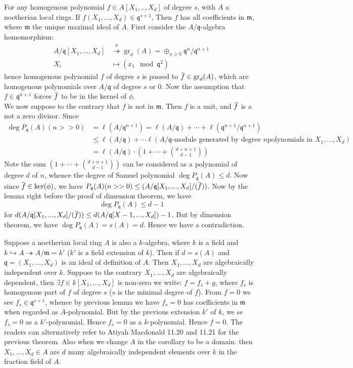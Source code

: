 \documentclass[12pt]{article}
\theoremstyle{definition}
\theoremstyle{plain}
\DeclareMathOperator{\gr}{gr}
\newcommand{\inj}{\hookrightarrow}
\newcommand{\surj}{\twoheadrightarrow}
\newcommand{\overbar}[1]{\mkern 1.5mu\overline{\mkern-1.5mu#1\mkern-1.5mu}\mkern 1.5mu}
\renewcommand{\bar}{\overbar}
\begin{document}
\Lemma For any homogenous polynomial $f\in A[X_1, .., X_d]$ of degree $s$, with $A$ a noetherian local rings. If $f(X_1, ..., X_d)\in \mathfrak{q}^{s+1}$,  Then $f$ has all coefficients in $\mathfrak{m}$, where $\mathfrak{m}$ the unique maximal ideal of $A$.
\proof First consider the $A/\mathfrak{q}$-algebra homomorphism:
\begin{align*}
  A/\mathfrak{q}[X_1, ..., X_d]&\overset{\phi}{\twoheadrightarrow} \gr_d(A)=\oplus_{n\geq 0}\mathfrak{q}^n/\mathfrak{q}^{n+1}\\
  X_i&\mapsto (x_1 \mod \mathfrak{q}^2)
\end{align*}
hence homogenous polynomial $f$ of degree $s$ is passed to $\bar{f}\in \gr_d(A)$, which are homogenous polynomials over $A/\mathfrak{q}$ of degree $s$ or $0$. Now the assumption that $f\in \mathfrak{q}^{n+1}$ forces $\bar{f}$ to be in the kernel of $\phi$. \\
\indent We now suppose to the contrary that $f$ is not in $\mathfrak{m}$. Then $f$ is a unit, and $\bar{f}$ is a not a zero divisor. Since \begin{align*}
  \deg P_\mathfrak{q}(A)(n>>0)&=\ell(A/\mathfrak{q}^{n+1})=\ell(A/\mathfrak{q})+\cdots+\ell(\mathfrak{q}^{n+1}/\mathfrak{q}^{n+1})\\
  &\leq \ell(A/\mathfrak{q})+\cdots \ell(A/\mathfrak{q}\text{-module generated by degree }n\text{polynomials in }X_1, ..., X_d)\\
  &=\ell(A/\mathfrak{q})\cdot(1+\cdots +\binom{d+n+1}{d-1})
\end{align*}
Note the sum $(1+\cdots +\binom{d+n+1}{d-1})$ can be considered as a polynomial of degree $d$ of $n$, whence the degree of Samuel polynomial $\deg P_\mathfrak{q}(A)\leq d$. Now since $\bar{f}\in \ker(\phi)$, we have $P_\mathfrak{q}(A)(n>>0)\leq(A/\mathfrak{q}[X_1, ..., X_d]/(\bar{f}))$. Now by the lemma right before the proof of dimension theorem, we have 
\[\deg P_\mathfrak{q}(A)\leq d-1\]
for $d(A/\mathfrak{q}[X_1, ..., X_d]/(\bar{f}))\leq d(A/\mathfrak{q}[X-1, ..., X_d])-1$. But by dimension theorem, we have $\deg P_\mathfrak{q}(A)=s(A)=d$. Hence we have a contradiction.\qedhere

\Cor Suppose a noetherian local ring $A$ is also a $k$-algebra, where $k$ is a field and $k\inj A\surj A/\mathfrak{m}=k'$ ($k'$ is a field extension of $k$). Then if $d=s(A)$ and $\mathfrak{q}=(X_1, ..., X_d)$ is an ideal of definition of $A$. Then $X_1, ..., X_d$ are algebraically independent over $k$.
\proof Suppose to the contrary $X_1, ..., X_d$ are algebraically dependent, then $\exists f\in k[X_1, ..., X_d]$ is non-zero we write:
$f=f_s+g$, where $f_s$ is homogenous part of $f$ of degree $s$ ($s$ is the minimal degree of $f$). From $f=0$ we see $f_s\in\mathfrak{q}^{s+1}$, whence by previous lemma we have $f_s=0$ has coefficients in $\mathfrak{m}$ when regarded as $A$-polynomial. But by the previous extension $k'$ of $k$, we se $f_s=0$ as a $k'$-polynomial. Hence $f_s=0$ as a $k$-polynomial. Hence $f=0$.
\Rmk The readers can alternatively refer to Atiyah Macdonald 11.20 and 11.21 for the previous theorem. Also when we change $A$ in the corollary to be a domain. then $X_1, ..., X_d\in A$ are $d$ many algebraically independent elements over $k$ in the fraction field of $A$.
\end{document}
